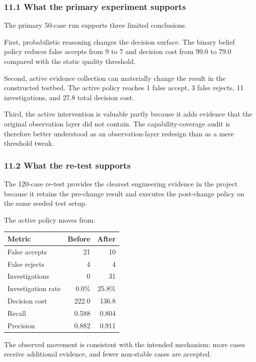 \documentclass[
]{article}
\begin{document}
\subsubsection{11.1 What the primary experiment
supports}\label{what-the-primary-experiment-supports}

The primary 50-case run supports three limited conclusions.

First, probabilistic reasoning changes the decision surface. The binary
belief policy reduces false accepts from 9 to 7 and decision cost from
99.0 to 79.0 compared with the static quality threshold.

Second, active evidence collection can materially change the result in
the constructed testbed. The active policy reaches 1 false accept, 3
false rejects, 11 investigations, and 27.8 total decision cost.

Third, the active intervention is valuable partly because it adds
evidence that the original observation layer did not contain. The
capability-coverage audit is therefore better understood as an
observation-layer redesign than as a mere threshold tweak.

\subsubsection{11.2 What the re-test
supports}\label{what-the-re-test-supports}

The 120-case re-test provides the clearest engineering evidence in the
project because it retains the pre-change result and executes the
post-change policy on the same seeded test setup.

The active policy moves from:

\begin{longtable}[]{@{}lrr@{}}
\toprule\noalign{}
Metric & Before & After \\
\midrule\noalign{}
\endhead
\bottomrule\noalign{}
\endlastfoot
False accepts & 21 & 10 \\
False rejects & 4 & 4 \\
Investigations & 0 & 31 \\
Investigation rate & 0.0\% & 25.8\% \\
Decision cost & 222.0 & 136.8 \\
Recall & 0.588 & 0.804 \\
Precision & 0.882 & 0.911 \\
\end{longtable}

The observed movement is consistent with the intended mechanism: more
cases receive additional evidence, and fewer non-stable cases are
accepted.
\end{document}

